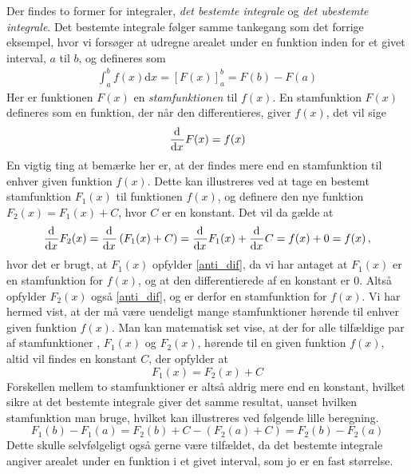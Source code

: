 Der findes to former for integraler, \emph{det bestemte integrale} og \emph{det ubestemte
	integrale}. Det bestemte integrale følger samme tankegang som det forrige eksempel,
hvor vi forsøger at udregne arealet under en funktion inden for et givet interval,
$a$ til $b$, og defineres som
\begin{align*}
\int_{a}^{b} f(x) \text{d}x = [F(x)]_{a}^{b} = F(b) - F(a)
\end{align*}
Her er funktionen $F(x)$ en \emph{stamfunktionen} til $f(x)$. En stamfunktion $F(x)$ defineres som en funktion,
der når den differentieres, giver $f(x)$, det vil sige
\begin{equation}
\label{anti_dif}
\frac{\mathrm{d}^{}{}}{{\mathrm{d} {x}}^{}} F(x) = f(x)
\end{equation}
En vigtig ting at bemærke her er, at der findes mere end en stamfunktion til enhver given funktion $f(x)$. Dette kan illustreres ved at tage en bestemt stamfunktion $F_1(x)$ til funktionen $f(x)$, og definere den nye funktion $F_2(x) = F_1(x) + C$, hvor $C$ er en konstant. Det vil da gælde at
\begin{equation*}
\frac{\mathrm{d}^{}{}}{{\mathrm{d} {x}}^{}} F_2(x) = \frac{\mathrm{d}^{}{}}{{\mathrm{d} {x}}^{}} \left( F_1(x) + C \right) = \frac{\mathrm{d}^{}{}}{{\mathrm{d} {x}}^{}} F_1(x) + \frac{\mathrm{d}^{}{}}{{\mathrm{d} {x}}^{}} C = f(x) + 0 = f(x) \, ,
\end{equation*}
hvor det er brugt, at $F_1(x)$ opfylder \eqref{anti_dif}, da vi har antaget at $F_1(x)$ er en stamfunktion for $f(x)$, og at den differentierede af en konstant er $0$. Altså opfylder $F_2(x)$ også \eqref{anti_dif}, og er derfor en stamfunktion for $f(x)$. Vi har hermed vist, at der må være uendeligt mange stamfunktioner hørende til enhver given funktion $f(x)$. Man kan matematisk set vise, at der for alle tilfældige par af stamfunktioner , $F_1(x)$ og $F_2(x)$, hørende til en given funktion $f(x)$, altid vil findes en konstant $C$, der opfylder at
\begin{equation*}
F_1(x) = F_2(x) + C
\end{equation*}
Forskellen mellem to stamfunktioner er altså aldrig mere end en konstant, hvilket sikre at det bestemte integrale giver det samme resultat, uanset hvilken stamfunktion man bruge, hvilket kan illustreres ved følgende lille beregning.
\begin{equation*}
F_1(b) - F_1(a) = F_2(b) + C - \left( F_2(a) + C \right) = F_2(b) - F_2(a)
\end{equation*}
Dette skulle selvfølgeligt også gerne være tilfældet, da det bestemte integrale angiver arealet under en funktion i et givet interval, som jo er en fast størrelse.\\

